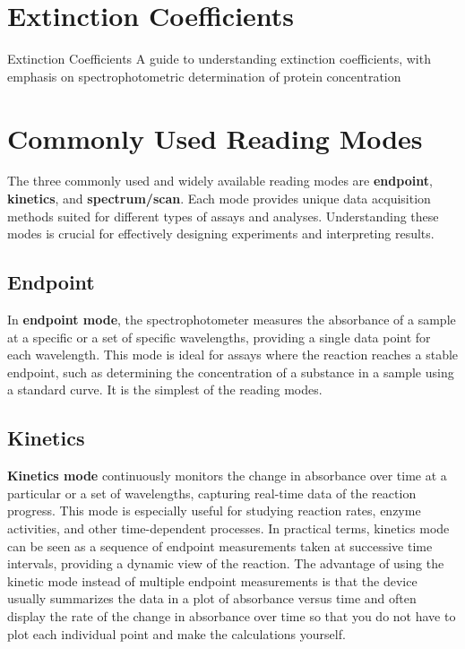 \documentclass[
  9pt,
  american,
  a5paper,
  extrafontsizes,onecolumn,openright
  ]{memoir}
\begin{document}
\section{Extinction Coefficients}\label{extinction-coefficients}

Extinction Coefficients
A guide to understanding extinction coefficients, with emphasis on
spectrophotometric determination of protein concentration

\section{Commonly Used Reading Modes}\label{commonly-used-reading-modes}

The three commonly used and widely available reading modes are \textbf{endpoint}, \textbf{kinetics}, and \textbf{spectrum/scan}. Each mode provides unique data acquisition methods suited for different types of assays and analyses. Understanding these modes is crucial for effectively designing experiments and interpreting results.

\subsection{Endpoint}\label{endpoint}

In \textbf{endpoint mode}, the spectrophotometer measures the absorbance of a sample at a specific or a set of specific wavelengths, providing a single data point for each wavelength. This mode is ideal for assays where the reaction reaches a stable endpoint, such as determining the concentration of a substance in a sample using a standard curve. It is the simplest of the reading modes.

\subsection{Kinetics}\label{kinetics}

\textbf{Kinetics mode} continuously monitors the change in absorbance over time at a particular or a set of wavelengths, capturing real-time data of the reaction progress. This mode is especially useful for studying reaction rates, enzyme activities, and other time-dependent processes. In practical terms, kinetics mode can be seen as a sequence of endpoint measurements taken at successive time intervals, providing a dynamic view of the reaction. The advantage of using the kinetic mode instead of multiple endpoint measurements is that the device usually summarizes the data in a plot of absorbance versus time and often display the rate of the change in absorbance over time so that you do not have to plot each individual point and make the calculations yourself.
\end{document}
